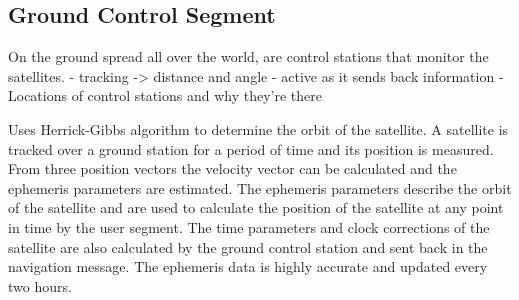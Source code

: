 \subsection{Ground Control Segment}
On the ground spread all over the world, are control stations that monitor the satellites. 
- tracking -> distance and angle - active as it sends back information
-Locations of control stations and why they're there

Uses Herrick-Gibbs algorithm to determine the orbit of the satellite. A satellite is tracked over a ground station for a period of time and its position is measured. From three position vectors the velocity vector can be calculated and the ephemeris parameters are estimated. The ephemeris parameters describe the orbit of the satellite and are used to calculate the position of the satellite at any point in time by the user segment. The time parameters and clock corrections of the satellite are also calculated by the ground control station and sent back in the navigation message.
The ephemeris data is highly accurate and updated every two hours.




